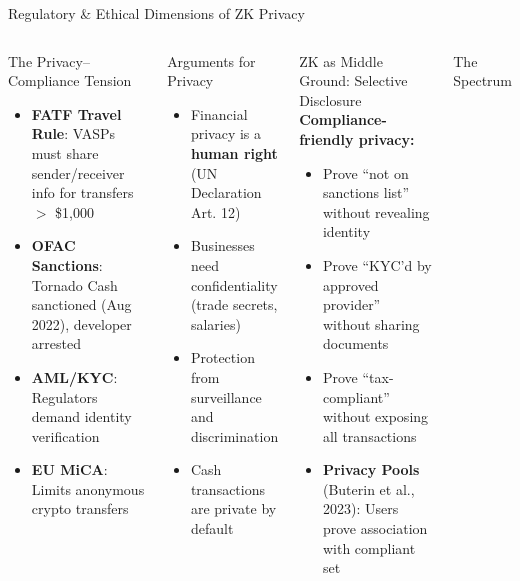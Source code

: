 \documentclass[8pt,aspectratio=169]{beamer}
\begin{document}
\begin{frame}{Regulatory \& Ethical Dimensions of ZK Privacy}
\begin{columns}[T]
\begin{alertblock}{\footnotesize The Privacy--Compliance Tension}
\footnotesize
\begin{itemize}
\item \textbf{FATF Travel Rule}: VASPs must share sender/receiver info for transfers $>$ \$1,000
\item \textbf{OFAC Sanctions}: Tornado Cash sanctioned (Aug 2022), developer arrested
\item \textbf{AML/KYC}: Regulators demand identity verification
\item \textbf{EU MiCA}: Limits anonymous crypto transfers
\end{itemize}
\end{alertblock}
\vspace{0.1cm}
\begin{block}{\footnotesize Arguments for Privacy}
\footnotesize
\begin{itemize}
\item Financial privacy is a \textbf{human right} (UN Declaration Art. 12)
\item Businesses need confidentiality (trade secrets, salaries)
\item Protection from surveillance and discrimination
\item Cash transactions are private by default
\end{itemize}
\end{block}
\begin{exampleblock}{\footnotesize ZK as Middle Ground: Selective Disclosure}
\footnotesize
\textbf{Compliance-friendly privacy:}
\begin{itemize}
\item Prove ``not on sanctions list'' without revealing identity
\item Prove ``KYC'd by approved provider'' without sharing documents
\item Prove ``tax-compliant'' without exposing all transactions
\item \textbf{Privacy Pools} (Buterin et al., 2023): Users prove association with compliant set
\end{itemize}
\end{exampleblock}
\vspace{0.1cm}
\begin{block}{\footnotesize The Spectrum}

\end{block}
\end{columns}
\end{frame}
\end{document}
